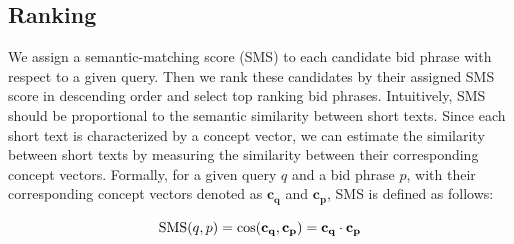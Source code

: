 \subsection{Ranking}
We assign a semantic-matching score (SMS) to each candidate bid phrase
with respect to a given query.  Then we rank these candidates by their
assigned SMS score in descending order and select top ranking bid
phrases.  Intuitively, SMS should be proportional to the semantic
similarity between short texts.  Since each short text is
characterized by a concept vector, we can estimate the similarity
between short texts by measuring the similarity between their
corresponding concept vectors.  Formally, for a given query $q$ and a
bid phrase $p$, with their corresponding concept vectors denoted as
$\mathbf{c_q}$ and $\mathbf{c_p}$, SMS is defined as follows:
\begin{definition}
\begin{equation}
\textnormal{SMS}(q,p)=\cos(\mathbf{c_q},\mathbf{c_p})=\mathbf{c_q}\cdot\mathbf{c_p}
\end{equation}
\end{definition}
%
%
%
